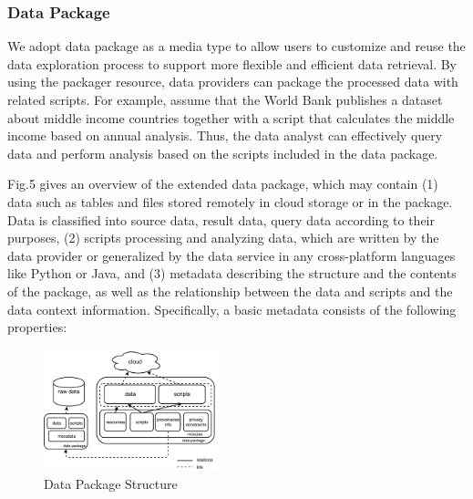 \documentclass[10pt, conference, compsocconf]{IEEEtran}
\begin{document}
\subsubsection{Data Package}
We adopt data package as a media type to allow users to customize and reuse the data exploration process to support more flexible and efficient data retrieval. By using the packager resource, data providers can package the processed data with related scripts. For example, assume that the World Bank publishes a dataset about middle income countries together with a script that calculates the middle income based on annual analysis. Thus, the data analyst can effectively query data and perform analysis based on the scripts included in the data package. 

Fig.5 gives an overview of the extended data package, which may contain (1) data such as tables and files stored remotely in cloud storage or in the package. Data is classified into source data, result data, query data according to their purposes, (2) scripts processing and analyzing data, which are written by the data provider or generalized by the data service in any cross-platform languages like Python or Java, and (3) metadata describing the structure and the contents of the package, as well as the relationship between the data and scripts and the data context information. Specifically, a basic metadata consists of the following properties: 
\begin{figure}[th]
	\centering
	\includegraphics[width=0.45\textwidth]{dataPackageStructure.pdf}
	\caption{Data Package Structure}
	\label{fig.5}
\end{figure}
\end{document}
